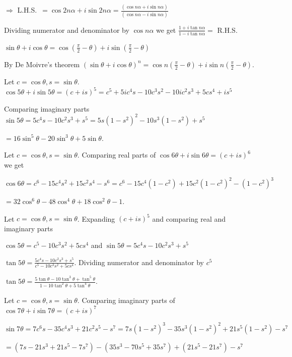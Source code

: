   $\Rightarrow$ L.H.S.\ $= \cos2n\alpha + i\sin2n\alpha = \frac{(\cos n\alpha + i\sin n\alpha)}{(\cos
    n\alpha - i\sin n\alpha)}$

  Dividing numerator and denominator by $\cos n\alpha$ we get $\frac{1 + i\tan n\alpha}{1 - i\tan n\alpha} =$
  R.H.S.
\item $\sin\theta + i\cos\theta = \cos\left(\frac{\pi}{2} - \theta\right) + i\sin\left(\frac{\pi}{2} -
  \theta\right)$

  By De Moivre's theorem $(\sin\theta + i\cos\theta)^n = \cos n\left(\frac{\pi}{2} - \theta\right) + i\sin
  n\left(\frac{\pi}{2} - \theta\right)$.
\item Let $c = \cos\theta, s = \sin\theta$. $\cos5\theta + i\sin5\theta = (c + is)^5 = c^5 + 5ic^4s -
  10c^3s^2 - 10ic^2s^3 + 5cs^4 + is^5$

  Comparing imaginary parts $\sin5\theta = 5c^4s - 10c^2s^3 + s^5 = 5s\left(1 - s^2\right)^2 - 10s^3\left(1
  - s^2\right) + s^5$

  $= 16\sin^5\theta - 20\sin^3\theta + 5\sin\theta$.
\item Let $c = \cos\theta, s = \sin\theta$. Comparing real parts of $\cos6\theta + i\sin6\theta = (c +
  is)^6$ we get

  $\cos6\theta = c^6 - 15c^4s^2 + 15c^2s^4 - s^6 = c^6 - 15c^4\left(1 - c^2\right) + 15c^2\left(1 -
  c^2\right)^2 - \left(1 - c^2\right)^3$

  $= 32\cos^6\theta - 48\cos^4\theta + 18\cos^2\theta - 1$.
\item Let $c = \cos\theta, s = \sin\theta$. Expanding $(c + is)^5$ and comparing real and imaginary parts

  $\cos5\theta = c^5 - 10c^3s^2 + 5cs^4$ and $\sin5\theta = 5c^4s - 10c^2s^3 + s^5$

  $\tan5\theta = \frac{5c^4s - 10c^2s^3 + s^5}{c^5 - 10c^3s^2 + 5cs^4}$. Dividing numerator and denominator
  by $c^5$

  $\tan5\theta = \frac{5\tan\theta - 10\tan^3\theta + \tan^5\theta}{1 - 10\tan^2\theta + 5\tan^4\theta}$.
\item Let $c = \cos\theta, s = \sin\theta$. Comparing imaginary parts of $\cos7\theta + i\sin7\theta = (c +
  is)^7$

  $\sin7\theta = 7c^6s - 35c^4s^3 + 21c^2s^5 - s^7 = 7s\left(1 - s^2\right)^3 - 35s^3\left(1 - s^2\right)^2
  + 21s^5\left(1 - s^2\right) - s^7$

  $= (7s - 21s^3 + 21s^5 - 7s^7) - (35s^3 - 70s^5 + 35s^7) + (21s^5 - 21s^7) - s^7$

